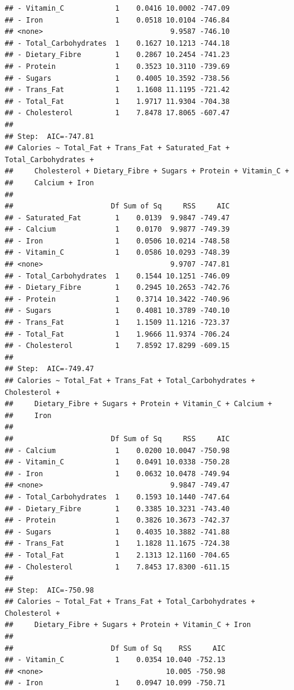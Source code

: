 \documentclass[
]{article}
\begin{document}
\begin{verbatim}
## - Vitamin_C            1    0.0416 10.0002 -747.09
## - Iron                 1    0.0518 10.0104 -746.84
## <none>                              9.9587 -746.10
## - Total_Carbohydrates  1    0.1627 10.1213 -744.18
## - Dietary_Fibre        1    0.2867 10.2454 -741.23
## - Protein              1    0.3523 10.3110 -739.69
## - Sugars               1    0.4005 10.3592 -738.56
## - Trans_Fat            1    1.1608 11.1195 -721.42
## - Total_Fat            1    1.9717 11.9304 -704.38
## - Cholesterol          1    7.8478 17.8065 -607.47
## 
## Step:  AIC=-747.81
## Calories ~ Total_Fat + Trans_Fat + Saturated_Fat + Total_Carbohydrates + 
##     Cholesterol + Dietary_Fibre + Sugars + Protein + Vitamin_C + 
##     Calcium + Iron
## 
##                       Df Sum of Sq     RSS     AIC
## - Saturated_Fat        1    0.0139  9.9847 -749.47
## - Calcium              1    0.0170  9.9877 -749.39
## - Iron                 1    0.0506 10.0214 -748.58
## - Vitamin_C            1    0.0586 10.0293 -748.39
## <none>                              9.9707 -747.81
## - Total_Carbohydrates  1    0.1544 10.1251 -746.09
## - Dietary_Fibre        1    0.2945 10.2653 -742.76
## - Protein              1    0.3714 10.3422 -740.96
## - Sugars               1    0.4081 10.3789 -740.10
## - Trans_Fat            1    1.1509 11.1216 -723.37
## - Total_Fat            1    1.9666 11.9374 -706.24
## - Cholesterol          1    7.8592 17.8299 -609.15
## 
## Step:  AIC=-749.47
## Calories ~ Total_Fat + Trans_Fat + Total_Carbohydrates + Cholesterol + 
##     Dietary_Fibre + Sugars + Protein + Vitamin_C + Calcium + 
##     Iron
## 
##                       Df Sum of Sq     RSS     AIC
## - Calcium              1    0.0200 10.0047 -750.98
## - Vitamin_C            1    0.0491 10.0338 -750.28
## - Iron                 1    0.0632 10.0478 -749.94
## <none>                              9.9847 -749.47
## - Total_Carbohydrates  1    0.1593 10.1440 -747.64
## - Dietary_Fibre        1    0.3385 10.3231 -743.40
## - Protein              1    0.3826 10.3673 -742.37
## - Sugars               1    0.4035 10.3882 -741.88
## - Trans_Fat            1    1.1828 11.1675 -724.38
## - Total_Fat            1    2.1313 12.1160 -704.65
## - Cholesterol          1    7.8453 17.8300 -611.15
## 
## Step:  AIC=-750.98
## Calories ~ Total_Fat + Trans_Fat + Total_Carbohydrates + Cholesterol + 
##     Dietary_Fibre + Sugars + Protein + Vitamin_C + Iron
## 
##                       Df Sum of Sq    RSS     AIC
## - Vitamin_C            1    0.0354 10.040 -752.13
## <none>                             10.005 -750.98
## - Iron                 1    0.0947 10.099 -750.71

\end{verbatim}
\end{document}
